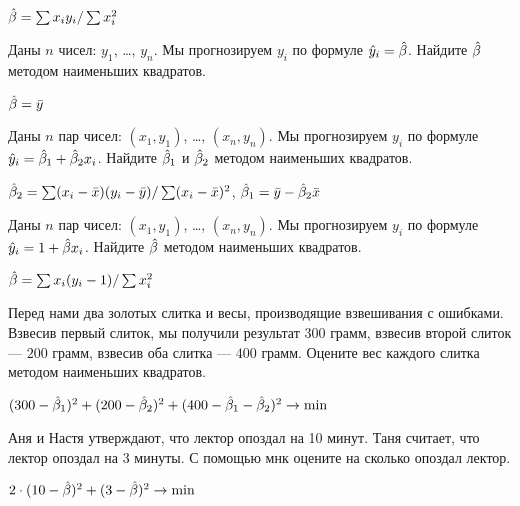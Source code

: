\documentclass[pdftex,11pt,openany]{book}\usepackage[]{graphicx}\usepackage[]{color}
\begin{document}
\begin{solution}
$\hat{\beta}=\sum x_i y_i/\sum x_i^2$
\end{solution}

\begin{problem}
Даны $n$ чисел: $y_1$, \ldots, $y_n$. Мы прогнозируем $y_i$ по формуле $\hat{y}_i=\hat{\beta}$. Найдите $\hat{\beta}$ методом наименьших квадратов. 
\end{problem}
\begin{solution}
$\hat{\beta}=\bar{y}$
\end{solution}

\begin{problem}
Даны $n$ пар чисел: $(x_1, y_1)$, \ldots, $(x_n,y_n)$. Мы прогнозируем $y_i$ по формуле $\hat{y}_i=\hat{\beta}_1+\hat{\beta}_2 x_i$. Найдите $\hat{\beta}_1$ и $\hat{\beta}_2$ методом наименьших квадратов. 
\end{problem}
\begin{solution}
$\hat{\beta}_2=\sum (x_i-\bar{x})(y_i-\bar{y})/\sum(x_i-\bar{x})^2$, $\hat{\beta}_1=\bar{y}-\hat{\beta}_2\bar{x}$
\end{solution}

\begin{problem}
Даны $n$ пар чисел: $(x_1, y_1)$, \ldots, $(x_n,y_n)$. Мы прогнозируем $y_i$ по формуле $\hat{y}_i=1+\hat{\beta} x_i$. Найдите $\hat{\beta}$ методом наименьших квадратов. 
\end{problem}
\begin{solution}
$\hat{\beta}=\sum x_i (y_i-1)/\sum x_i^2$
\end{solution}

\begin{problem}
 Перед нами два золотых слитка и весы, производящие взвешивания с ошибками. Взвесив первый слиток, мы получили результат $300$ грамм, взвесив второй слиток --- $200$ грамм, взвесив оба слитка --- $400$ грамм. Оцените вес каждого слитка методом наименьших квадратов.
 \end{problem}
\begin{solution}
 $(300-\hat{\beta}_1)^2+(200-\hat{\beta}_2)^2+(400-\hat{\beta}_1-\hat{\beta}_2)^2\rightarrow\min$ 
\end{solution}


\begin{problem}
 Аня и Настя утверждают, что лектор опоздал на 10 минут. Таня считает, что лектор опоздал на 3 минуты. С помощью мнк оцените на сколько опоздал лектор. 
\end{problem}
\begin{solution}
 $2\cdot (10-\hat{\beta})^2+(3-\hat{\beta})^2\rightarrow\min$ 
\end{solution}
\end{document}

